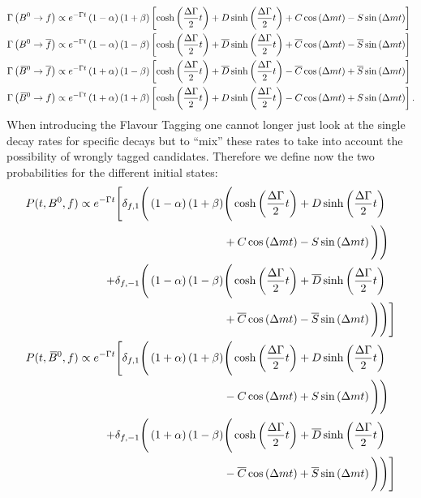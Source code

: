 \begin{align}
  \Gamma\left(B^0\rightarrow f\right) &\propto e^{-\Gamma t}\left(1-\alpha\right)\left(1+\beta\right)\left[\cosh\left(\frac{\Delta\Gamma}{2}t\right)
  +D\sinh\left(\frac{\Delta\Gamma}{2}t\right)+C\cos\left(\Delta mt\right)-S\sin\left(\Delta mt\right)\right]\label{eq:asymmetries_one}\\
  \Gamma\left(B^0\rightarrow \overline{f}\right) &\propto e^{-\Gamma t}\left(1-\alpha\right)\left(1-\beta\right)\left[\cosh\left(\frac{\Delta\Gamma}{2}t\right)
  +\overline{D}\sinh\left(\frac{\Delta\Gamma}{2}t\right)+\overline{C}\cos\left(\Delta mt\right)-\overline{S}\sin\left(\Delta mt\right)\right]
  \label{eq:asymmetries_two}\\
  \Gamma\left(\kern 0.18em\overline{\kern -0.18em B}{}^0\rightarrow \overline{f}\right) &\propto e^{-\Gamma t}\left(1+\alpha\right)\left(1-\beta\right)\left[\cosh\left(\frac{\Delta\Gamma}{2}t\right)
  +\overline{D}\sinh\left(\frac{\Delta\Gamma}{2}t\right)-\overline{C}\cos\left(\Delta mt\right)+\overline{S}\sin\left(\Delta mt\right)\right]
  \label{eq:asymmetries_three}\\
  \Gamma\left(\kern 0.18em\overline{\kern -0.18em B}{}^0\rightarrow f\right) &\propto e^{-\Gamma t}\left(1+\alpha\right)\left(1+\beta\right)\left[\cosh\left(\frac{\Delta\Gamma}{2}t\right)
  +D\sinh\left(\frac{\Delta\Gamma}{2}t\right)-C\cos\left(\Delta mt\right)+S\sin\left(\Delta mt\right)\right]\label{eq:asymmetries_four}.
\end{align}
When introducing the Flavour Tagging one cannot longer just look at the single decay rates for specific decays but to \enquote{mix} these
rates to take into account the possibility of wrongly tagged candidates. Therefore we define now the two probabilities for the different
initial states:
\begin{align*}
P(t,B^0,f)\propto e^{-\Gamma t}
\Bigg[\delta_{f,1}
\Bigg(\left(1-\alpha\right)\left(1+\beta\right) &\Bigg(\cosh\left(\frac{\Delta\Gamma}{2}t\right)+D\sinh\left(\frac{\Delta\Gamma}{2}t\right)\\
&+C\cos\left(\Delta m t\right)-S\sin\left(\Delta m t\right)\Bigg)\Bigg)\\
+\delta_{f,-1}\Bigg(\left(1-\alpha\right)\left(1-\beta\right) &\Bigg(\cosh\left(\frac{\Delta\Gamma}{2}t\right)+\overline{D}\sinh\left(\frac{\Delta\Gamma}{2}t\right)\\
&+\overline{C}\cos\left(\Delta m t\right)-\overline{S}\sin\left(\Delta m t\right)\Bigg)\Bigg)\Bigg]\\
P(t,\kern 0.18em\overline{\kern -0.18em B}{}^0,f)\propto e^{-\Gamma t}
\Bigg[\delta_{f,1}
\Bigg(\left(1+\alpha\right)\left(1+\beta\right) &\Bigg(\cosh\left(\frac{\Delta\Gamma}{2}t\right)+D\sinh\left(\frac{\Delta\Gamma}{2}t\right)\\
&-C\cos\left(\Delta m t\right)+S\sin\left(\Delta m t\right)\Bigg)\Bigg)\\
+\delta_{f,-1}\Bigg(\left(1+\alpha\right)\left(1-\beta\right) &\Bigg(\cosh\left(\frac{\Delta\Gamma}{2}t\right)+\overline{D}\sinh\left(\frac{\Delta\Gamma}{2}t\right)\\
&-\overline{C}\cos\left(\Delta m t\right)+\overline{S}\sin\left(\Delta m t\right)\Bigg)\Bigg)\Bigg]
\end{align*}
